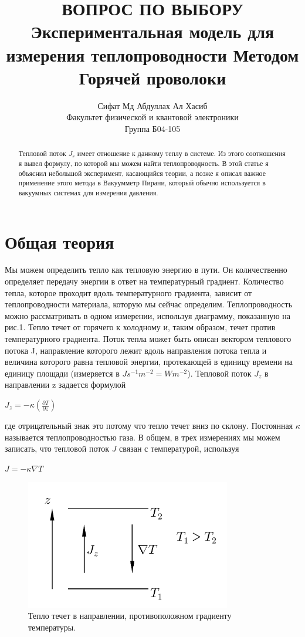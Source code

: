 \documentclass[a4paper, 12pt]{article}%
\author{Сифат Мд Абдуллах Ал Хасиб  \\
Факультет физической и квантовой электроники \\
Группа Б04-105}
\title{\textbf{ВОПРОС ПО ВЫБОРУ \\ 
Экспериментальная модель для измерения теплопроводности Методом Горячей проволоки}}
\begin{document}
\maketitle
\begin{abstract}
Тепловой поток $J_r$ имеет отношение к данному теплу в системе. Из этого соотношения я вывел формулу, по которой мы можем найти теплопроводность. В этой статье я объяснил небольшой эксперимент, касающийся теории, а позже я описал важное применение этого метода в Вакуумметр Пирани, который обычно используется в вакуумных системах для измерения давления.
\end{abstract}
\section{Общая теория}
Мы можем определить тепло как тепловую энергию в пути. Он количественно определяет передачу энергии в ответ на температурный градиент. Количество тепла, которое проходит вдоль температурного градиента, зависит от теплопроводности материала, которую мы сейчас определим. Теплопроводность можно рассматривать в одном измерении, используя диаграмму, показанную на рис.1. Тепло течет от горячего к холодному и, таким образом, течет против температурного градиента. Поток тепла может быть описан вектором теплового потока J, направление которого лежит вдоль направления потока тепла и величина которого равна тепловой энергии, протекающей в единицу времени на единицу площади (измеряется в $Js ^{-1}m^{-2} = Wm^{-2}$). Тепловой поток $J_z$ в направлении z задается формулой
\begin{center}
$J_z = -\kappa(\frac{\partial T}{\partial z})$
\end{center}
где отрицательный знак это потому что тепло течет вниз по склону. Постоянная $\kappa$ называется теплопроводностью газа. В общем, в трех измерениях мы можем записать, что тепловой поток $ J $ связан с температурой, используя
\begin{center}
$J = -\kappa \nabla T$
\end{center}

\begin{figure}[h]
\begin{center}
\includegraphics[width = 0.8\textwidth]{Bigar 1.png}
\caption{Тепло течет в направлении, противоположном градиенту температуры.}
\end{center}
\end{figure}
\newpage
\end{document}
